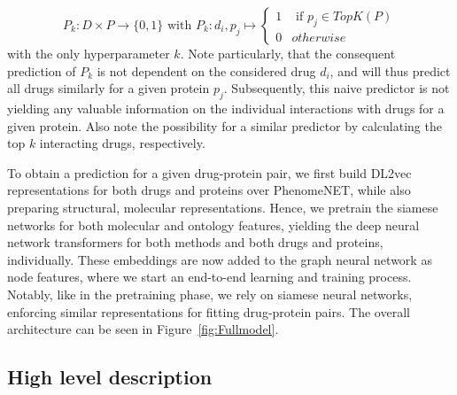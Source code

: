 \documentclass{bioinfo}
\begin{document}
\begin{equation*}
	P_k: D\times P \rightarrow \{0,1\} \text{ with } P_k: d_i, p_j \mapsto \begin{cases}
		1 & \text{ if }p_j \in TopK(P)\\
		0 & otherwise
	\end{cases}
\end{equation*}
with the only hyperparameter $k$. Note particularly, that the consequent prediction of $P_k$ is not dependent on the considered drug $d_i$, and will thus predict all drugs similarly for a given protein $p_j$. Subsequently, this naive predictor is not yielding any valuable information on the individual interactions with drugs for a given protein. Also note the possibility for a similar predictor by calculating the top $k$ interacting drugs, respectively.

To obtain a prediction for a given drug-protein pair, we first
build DL2vec representations for both drugs and proteins over PhenomeNET, while also preparing structural, molecular representations. Hence, we pretrain the siamese networks for both molecular and ontology features, yielding the deep neural network transformers for both methods and both drugs and proteins, individually. These embeddings are now added to the graph neural network as node features, where we start an end-to-end learning and training process. Notably, like in the pretraining phase, we rely on siamese neural networks, enforcing similar representations for fitting drug-protein pairs. The overall architecture can be seen in Figure~\ref{fig:Fullmodel}.

\subsection{High level description}
\end{document}
